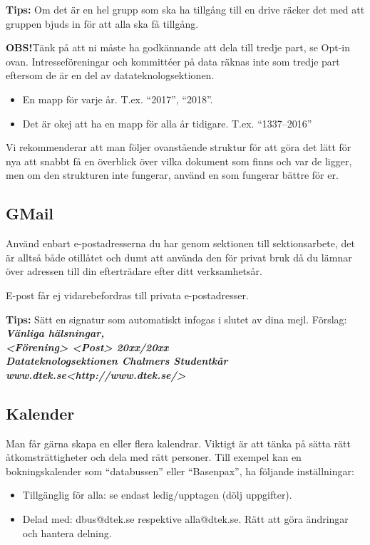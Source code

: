 \textbf{Tips:} Om det är en hel grupp som ska ha tillgång till en drive räcker det med att gruppen bjuds in för att alla ska få tillgång.

\textbf{OBS!}Tänk på att ni måste ha godkännande att dela till tredje part, se Opt-in ovan. Intresseföreningar och kommittéer på data räknas inte som tredje part eftersom de är en del av datateknologsektionen.

\begin{itemize}
    \item En mapp för varje år. T.ex. “2017”, “2018”.
    \item Det är okej att ha en mapp för alla år tidigare. T.ex. “1337–2016”
\end{itemize}

Vi rekommenderar att man följer ovanstående struktur för att göra det lätt för nya att
snabbt få en överblick över vilka dokument som finns och var de ligger, men om den
strukturen inte fungerar, använd en som fungerar bättre för er.

\subsection{GMail}
Använd enbart e-postadresserna du har genom sektionen till sektionsarbete, det är alltså
både otillåtet och dumt att använda den för privat bruk då du lämnar över adressen till
din efterträdare efter ditt verksamhetsår.

E-post får ej vidarebefordras till privata e-postadresser.

\textbf{Tips:} Sätt en signatur som automatiskt infogas i slutet av dina mejl. Förslag:\\
\textbf{\textit{Vänliga hälsningar,\\
<Förening> <Post> 20xx/20xx\\
Datateknologsektionen Chalmers Studentkår\\
www.dtek.se<http://www.dtek.se/>}}

\subsection{Kalender}
Man får gärna skapa en eller flera kalendrar. Viktigt är att tänka på sätta rätt åtkomsträttigheter och dela med rätt personer. Till exempel kan en bokningskalender som “databussen” eller “Basenpax”, ha följande inställningar:
\begin{itemize}
    \item Tillgänglig för alla: se endast ledig/upptagen (dölj uppgifter).
    \item Delad med: dbus@dtek.se respektive alla@dtek.se. Rätt att göra ändringar och hantera delning.
\end{itemize}

